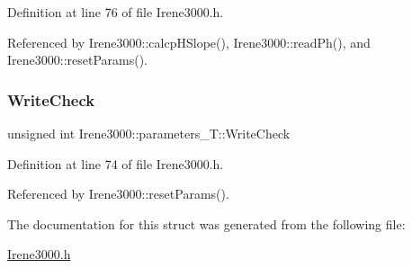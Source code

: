 Definition at line 76 of file Irene3000.\+h.



Referenced by Irene3000\+::calcp\+H\+Slope(), Irene3000\+::read\+Ph(), and Irene3000\+::reset\+Params().

\mbox{\label{structIrene3000_1_1parameters__T_a56f1f14d33a69300d580eda2dc52cecd}} 
\subsubsection{\texorpdfstring{Write\+Check}{WriteCheck}}
{\footnotesize\ttfamily unsigned int Irene3000\+::parameters\+\_\+\+T\+::\+Write\+Check}



Definition at line 74 of file Irene3000.\+h.



Referenced by Irene3000\+::reset\+Params().



The documentation for this struct was generated from the following file\+:\begin{DoxyCompactItemize}
\item 
\hyperlink{Irene3000_8h}{Irene3000.\+h}\end{DoxyCompactItemize}
